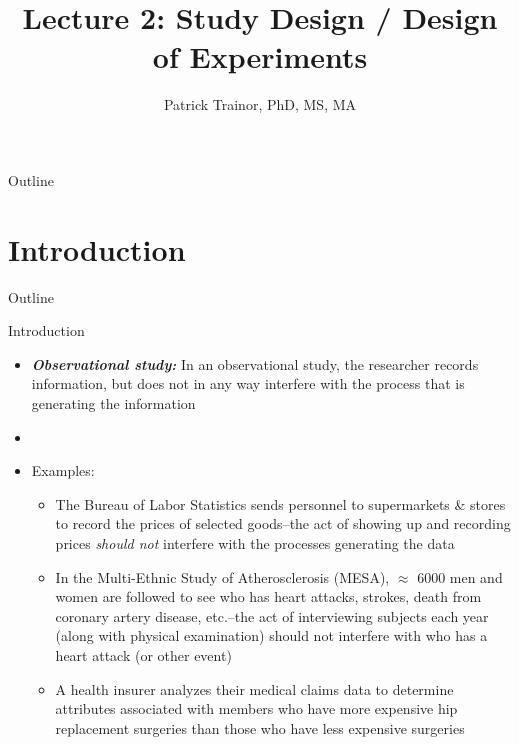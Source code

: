 \documentclass[xcolor=dvipsnames]{beamer}
\title[Lecture 2]{Lecture 2: Study Design / Design of Experiments}
\author[Patrick Trainor]{Patrick Trainor, PhD, MS, MA}
\institute[NMSU]{New Mexico State University}
\date{}
\begin{document}
\begin{frame}
\maketitle
\end{frame}

\begin{frame}{Outline}
\tableofcontents[hideallsubsections]
\end{frame}

\section{Introduction}
\begin{frame}{Outline}
\tableofcontents[currentsection,subsectionstyle=show/shaded/hide]
\end{frame}

\begin{frame}{Introduction}
	\begin{itemize}
		\item \textbf{\emph{Observational study:}} In an observational study, the researcher records information, but does not in any way interfere with the process that is generating the information \pause
		\item[]
		\item Examples: \pause
		\begin{itemize}
			\item The Bureau of Labor Statistics sends personnel to supermarkets \& stores to record the prices of selected goods--the act of showing up and recording prices \emph{should not} interfere with the processes generating the data \pause
			\item In the Multi-Ethnic Study of Atherosclerosis (MESA), $\approx$ 6000 men and women are followed to see who has heart attacks, strokes, death from coronary artery disease, etc.--the act of interviewing subjects each year (along with physical examination) should not interfere with who has a heart attack (or other event) \pause
			\item A health insurer analyzes their medical claims data to determine attributes associated with members who have more expensive hip replacement surgeries than those who have less expensive surgeries
		\end{itemize}
	\end{itemize}
\end{frame}
\end{document}
